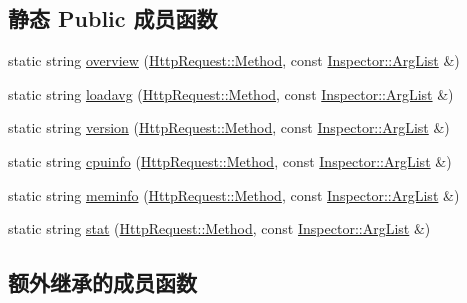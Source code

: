 \subsection*{静态 Public 成员函数}
\begin{DoxyCompactItemize}
\item 
static string \hyperlink{classmuduo_1_1net_1_1SystemInspector_a6c5dee6f9bf1f45afb67379698a87ecb}{overview} (\hyperlink{classmuduo_1_1net_1_1HttpRequest_a2a3c0067e44c5ef3210a256d06c16b0f}{Http\+Request\+::\+Method}, const \hyperlink{classmuduo_1_1net_1_1Inspector_aa22799cd3b4f56688d431d68c2d014a0}{Inspector\+::\+Arg\+List} \&)
\item 
static string \hyperlink{classmuduo_1_1net_1_1SystemInspector_a006590ef4e572bac984bf8b400341de3}{loadavg} (\hyperlink{classmuduo_1_1net_1_1HttpRequest_a2a3c0067e44c5ef3210a256d06c16b0f}{Http\+Request\+::\+Method}, const \hyperlink{classmuduo_1_1net_1_1Inspector_aa22799cd3b4f56688d431d68c2d014a0}{Inspector\+::\+Arg\+List} \&)
\item 
static string \hyperlink{classmuduo_1_1net_1_1SystemInspector_a86619e1e0a9567f11ced75514da7543f}{version} (\hyperlink{classmuduo_1_1net_1_1HttpRequest_a2a3c0067e44c5ef3210a256d06c16b0f}{Http\+Request\+::\+Method}, const \hyperlink{classmuduo_1_1net_1_1Inspector_aa22799cd3b4f56688d431d68c2d014a0}{Inspector\+::\+Arg\+List} \&)
\item 
static string \hyperlink{classmuduo_1_1net_1_1SystemInspector_ad1f777bba9ee66741dc5336f969125f9}{cpuinfo} (\hyperlink{classmuduo_1_1net_1_1HttpRequest_a2a3c0067e44c5ef3210a256d06c16b0f}{Http\+Request\+::\+Method}, const \hyperlink{classmuduo_1_1net_1_1Inspector_aa22799cd3b4f56688d431d68c2d014a0}{Inspector\+::\+Arg\+List} \&)
\item 
static string \hyperlink{classmuduo_1_1net_1_1SystemInspector_ac3eca256c1b4531eb121758cba6d5f68}{meminfo} (\hyperlink{classmuduo_1_1net_1_1HttpRequest_a2a3c0067e44c5ef3210a256d06c16b0f}{Http\+Request\+::\+Method}, const \hyperlink{classmuduo_1_1net_1_1Inspector_aa22799cd3b4f56688d431d68c2d014a0}{Inspector\+::\+Arg\+List} \&)
\item 
static string \hyperlink{classmuduo_1_1net_1_1SystemInspector_af0ab0448a3f1b08257900f1a0df80fce}{stat} (\hyperlink{classmuduo_1_1net_1_1HttpRequest_a2a3c0067e44c5ef3210a256d06c16b0f}{Http\+Request\+::\+Method}, const \hyperlink{classmuduo_1_1net_1_1Inspector_aa22799cd3b4f56688d431d68c2d014a0}{Inspector\+::\+Arg\+List} \&)
\end{DoxyCompactItemize}
\subsection*{额外继承的成员函数}


